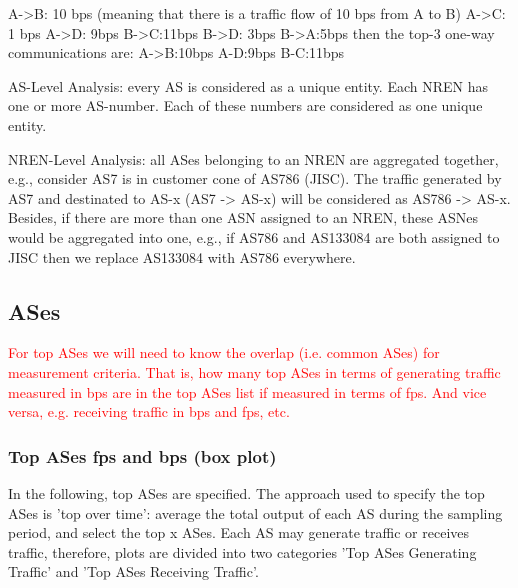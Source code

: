 \documentclass[10pt, journal, letterpaper]{IEEEtran}
\newcommand{\red}[1]{\textcolor{red}{#1}}
\begin{document}
A->B: 10 bps (meaning that there is a traffic flow of 10 bps from A to B)
A->C: 1 bps
A->D: 9bps
B->C:11bps
B->D: 3bps
B->A:5bps
then the top-3 one-way communications are:
A->B:10bps
A-D:9bps
B-C:11bps

AS-Level Analysis: every AS is considered as a unique entity. Each NREN has one or more AS-number. Each of these numbers are considered as one unique entity.

NREN-Level Analysis: all ASes belonging to an NREN are aggregated together, e.g., consider AS7 is in customer cone of AS786 (JISC). The traffic generated by AS7 and destinated to AS-x (AS7 -> AS-x) will be considered as AS786 -> AS-x. Besides, if there are more than one ASN assigned to an NREN, these ASNes would be aggregated into one, e.g., if AS786 and AS133084 are both assigned to JISC then we replace AS133084 with AS786 everywhere.



\subsection{ASes}

\red{For top ASes we will need to know the overlap (i.e. common ASes) for measurement criteria. That is, how many top ASes in terms of generating traffic measured in bps are in the top ASes list if measured in terms of fps. And vice versa, e.g. receiving traffic in bps and fps, etc.}

\subsubsection{Top ASes fps and bps (box plot)}
In the following, top ASes are specified. The approach used to specify the top ASes is 'top over time': average the total output of each AS during the sampling period, and select the top x ASes.
Each AS may generate traffic or receives traffic, therefore, plots are divided into two categories 'Top ASes Generating Traffic' and 'Top ASes Receiving Traffic'.
\end{document}
